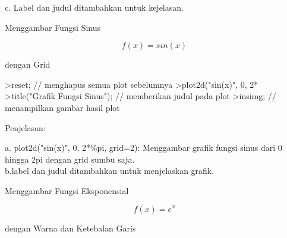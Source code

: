 \documentclass{article}
\begin{document}
\begin{eulernotebook}
\begin{eulercomment}
\begin{eulercomment}
\begin{eulercomment}
\begin{eulercomment}
\begin{eulercomment}
\begin{eulercomment}
\begin{eulercomment}
\begin{eulercomment}
\begin{eulercomment}
\begin{eulercomment}
\begin{eulercomment}
\begin{eulercomment}
\begin{eulercomment}
\begin{eulercomment}
\begin{eulercomment}
\begin{eulercomment}
\begin{eulercomment}
\begin{eulercomment}
\begin{eulercomment}
\begin{eulercomment}
\begin{eulercomment}
\begin{eulercomment}
\begin{eulercomment}
\begin{eulercomment}
\begin{eulercomment}
\begin{eulercomment}
\begin{eulercomment}
\begin{eulercomment}
\begin{eulercomment}
c. Label dan judul ditambahkan untuk kejelasan.\\
\end{eulercomment}
\eulersubheading{}
\begin{eulercomment}
Menggambar Fungsi Sinus

\end{eulercomment}
\begin{eulerformula}
\[
f(x)=sin(x)
\]
\end{eulerformula}
\begin{eulercomment}
dengan Grid\\
\end{eulercomment}
\begin{eulerprompt}
>reset; // menghapus semua plot sebelumnya
>plot2d("sin(x)", 0, 2*%
>title("Grafik Fungsi Sinus"); // memberikan judul pada plot
>insimg; // menampilkan gambar hasil plot
\end{eulerprompt}
\begin{eulercomment}
Penjelasan:

a. plot2d("sin(x)", 0, 2*\%pi, grid=2): Menggambar grafik fungsi sinus
dari 0 hingga 2pi dengan grid sumbu saja.\\
b.label dan judul ditambahkan untuk menjelaskan grafik.

\end{eulercomment}
\eulersubheading{}
\begin{eulercomment}
Menggambar Fungsi Eksponensial

\end{eulercomment}
\begin{eulerformula}
\[
f(x)=e^x
\]
\end{eulerformula}
\begin{eulercomment}
dengan Warna dan Ketebalan Garis


\end{eulercomment}
\end{eulercomment}
\end{eulercomment}
\end{eulercomment}
\end{eulercomment}
\end{eulercomment}
\end{eulercomment}
\end{eulercomment}
\end{eulercomment}
\end{eulercomment}
\end{eulercomment}
\end{eulercomment}
\end{eulercomment}
\end{eulercomment}
\end{eulercomment}
\end{eulercomment}
\end{eulercomment}
\end{eulercomment}
\end{eulercomment}
\end{eulercomment}
\end{eulercomment}
\end{eulercomment}
\end{eulercomment}
\end{eulercomment}
\end{eulercomment}
\end{eulercomment}
\end{eulercomment}
\end{eulercomment}
\end{eulercomment}
\end{eulernotebook}
\end{document}

